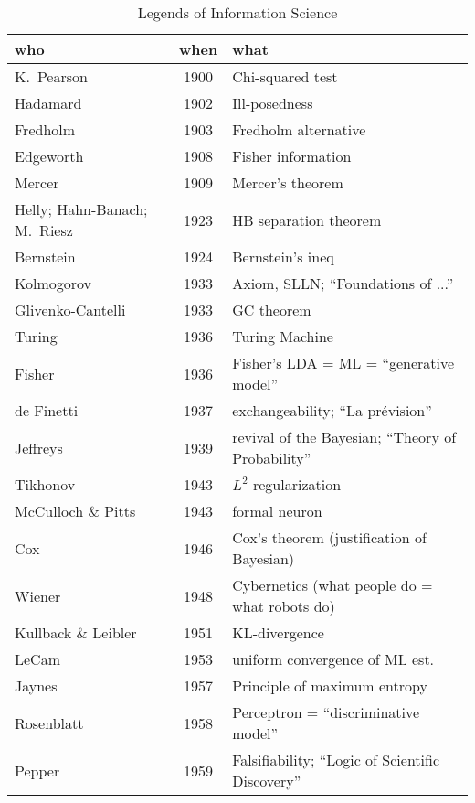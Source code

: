 \documentclass[a4paper]{article}
\begin{document}
\begin{table}[h]
  \centering
  \caption{Legends of Information Science}
  \begin{tabular}{@{\hspace{2em}}lcp{7cm}}
    \toprule
    who & when & what \\
    \midrule
    K.~Pearson & 1900 & Chi-squared test \\
    Hadamard & 1902 & Ill-posedness \\
    Fredholm & 1903 & Fredholm alternative \\
    Edgeworth & 1908 & Fisher information \\
    Mercer & 1909 & Mercer's theorem \\
    Helly; Hahn-Banach; M.~Riesz & 1923 & HB separation theorem \\
    Bernstein & 1924 & Bernstein's ineq \\
    Kolmogorov & 1933 & Axiom, SLLN; ``Foundations of ...'' \\
    Glivenko-Cantelli & 1933 & GC theorem \\
    Turing & 1936 & Turing Machine \\
    Fisher & 1936 & Fisher's LDA = ML = ``generative model'' \\
    de Finetti & 1937 & exchangeability; ``La pr\'{e}vision'' \\
    Jeffreys & 1939 & revival of the Bayesian; ``Theory of Probability''\\
    Tikhonov & 1943 & $L^2$-regularization \\
    McCulloch \& Pitts & 1943 & formal neuron \\
    Cox & 1946 & Cox's theorem (justification of Bayesian) \\
    Wiener & 1948 & Cybernetics (what people do = what robots do) \\
    Kullback \& Leibler & 1951 & KL-divergence \\
    LeCam & 1953 & uniform convergence of ML est. \\
    Jaynes & 1957 & Principle of maximum entropy \\
    Rosenblatt & 1958 & Perceptron = ``discriminative model'' \\
    Pepper & 1959 & Falsifiability; ``Logic of Scientific Discovery'' \\
    \bottomrule
  \end{tabular}
\end{table}
\end{document}
